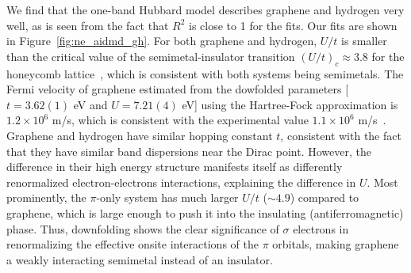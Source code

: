 We find that the one-band Hubbard model describes graphene and hydrogen very well, as is seen from the fact that $R^2$ is close to 1 for the fits. 
Our fits are shown in Figure~\ref{fig:ne_aidmd_gh}. For both graphene and hydrogen, $U/t$ is smaller than the critical value of the 
semimetal-insulator transition $(U/t)_c \approx 3.8$ for the honeycomb lattice~\cite{Sorella2012}, 
which is consistent with both systems being semimetals. The Fermi velocity of graphene estimated from the dowfolded parameters [$t=3.62(1)$ eV and $U=7.21(4)$ eV] using the 
Hartree-Fock approximation is $1.2\times 10^{6}$ m/s, which is consistent with the experimental value $1.1 \times 10^6$ m/s~\cite{Siegel2011}. 
Graphene and hydrogen have similar hopping constant $t$, consistent with the fact that they have similar band dispersions near the Dirac point. 
However, the difference in their high energy structure manifests itself as differently renormalized electron-electrons interactions, 
explaining the difference in $U$. Most prominently, the $\pi$-only system has much larger $U/t$ ($\sim4.9$) compared to graphene, 
which is large enough to push it into the insulating (antiferromagnetic) phase.
Thus, downfolding shows the clear significance of $\sigma$ electrons in renormalizing the effective onsite interactions of the $\pi$ orbitals, making graphene a weakly interacting semimetal instead of an insulator.  

